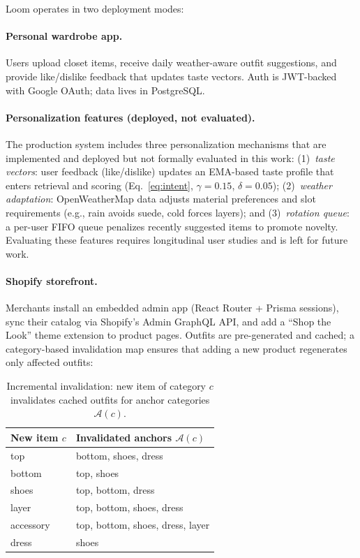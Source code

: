 \documentclass[10pt,twocolumn]{article}
\begin{document}
Loom operates in two deployment modes:

\paragraph{Personal wardrobe app.}
Users upload closet items, receive daily weather-aware outfit suggestions,
and provide like/dislike feedback that updates taste vectors.  Auth is
JWT-backed with Google OAuth; data lives in PostgreSQL.

\paragraph{Personalization features (deployed, not evaluated).}
The production system includes three personalization mechanisms that are
implemented and deployed but not formally evaluated in this work:
(1)~\emph{taste vectors}: user feedback (like/dislike) updates an EMA-based
taste profile that enters retrieval and scoring
(Eq.~\ref{eq:intent}, $\gamma{=}0.15$, $\delta{=}0.05$);
(2)~\emph{weather adaptation}: OpenWeatherMap data adjusts material
preferences and slot requirements (e.g., rain avoids suede, cold forces
layers); and
(3)~\emph{rotation queue}: a per-user FIFO queue penalizes recently suggested
items to promote novelty.
Evaluating these features requires longitudinal user studies and is left
for future work.

\paragraph{Shopify storefront.}
Merchants install an embedded admin app (React Router + Prisma sessions),
sync their catalog via Shopify's Admin GraphQL API, and add a ``Shop the
Look'' theme extension to product pages.  Outfits are pre-generated and
cached; a category-based invalidation map ensures that adding a new product
regenerates only affected outfits:

\begin{table}[t]
\centering
\small
\caption{Incremental invalidation: new item of category $c$ invalidates
cached outfits for anchor categories $\mathcal{A}(c)$.}
\label{tab:invalidation}
\begin{tabular}{ll}
\toprule
New item $c$ & Invalidated anchors $\mathcal{A}(c)$ \\
\midrule
top       & bottom, shoes, dress \\
bottom    & top, shoes \\
shoes     & top, bottom, dress \\
layer     & top, bottom, shoes, dress \\
accessory & top, bottom, shoes, dress, layer \\
dress     & shoes \\
\bottomrule
\end{tabular}
\end{table}
\end{document}
